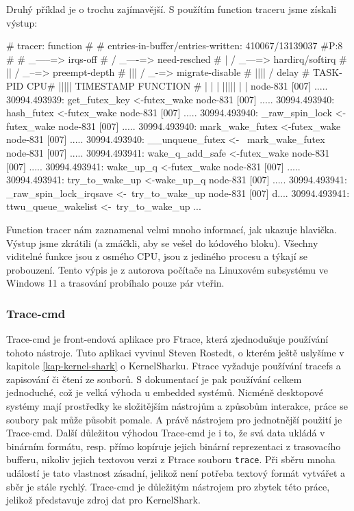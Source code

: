 Druhý příklad je o trochu zajímavější. S použítím function traceru jsme získali výstup:
\begin{code}
# tracer: function
#
# entries-in-buffer/entries-written: 410067/13139037   #P:8
#
#                      _-----=> irqs-off
#                     / _----=> need-resched
#                    | / _---=> hardirq/softirq
#                    || / _--=> preempt-depth
#                    ||| / _-=> migrate-disable
#                    |||| /     delay
# TASK-PID     CPU#  |||||  TIMESTAMP  FUNCTION
#    | |         |   |||||     |         |
  node-831     [007] ..... 30994.493939: get_futex_key <-futex_wake
  node-831     [007] ..... 30994.493940: hash_futex <-futex_wake
  node-831     [007] ..... 30994.493940: _raw_spin_lock <-futex_wake
  node-831     [007] ..... 30994.493940: mark_wake_futex <-futex_wake
  node-831     [007] ..... 30994.493940: __unqueue_futex <- \
                                         mark_wake_futex
  node-831     [007] ..... 30994.493941: wake_q_add_safe <-futex_wake
  node-831     [007] ..... 30994.493941: wake_up_q <-futex_wake
  node-831     [007] ..... 30994.493941: try_to_wake_up <-wake_up_q
  node-831     [007] ..... 30994.493941: _raw_spin_lock_irqsave <-\
                                         try_to_wake_up
  node-831     [007] d.... 30994.493941: ttwu_queue_wakelist <-\
                                         try_to_wake_up
...
\end{code}
Function tracer nám zaznamenal velmi mnoho informací, jak ukazuje hlavička. Výstup jsme zkrátili (a zmáčkli, aby se vešel do kódového bloku). Všechny viditelné funkce jsou z osmého CPU, jsou z jediného procesu a týkají se probouzení. Tento výpis je z autorova počítače na Linuxovém subsystému ve Windows 11 a trasování probíhalo pouze pár vteřin.

\subsubsection{Trace-cmd}

Trace-cmd \cite{Trace-cmd-LWM} je front-endová aplikace pro Ftrace, která zjednodušuje používání tohoto nástroje. Tuto aplikaci vyvinul Steven Rostedt, o kterém ještě uslyšíme v kapitole \ref{kap-kernel-shark} o KernelSharku. Ftrace vyžaduje používání tracefs a zapisování či čtení ze souborů. S dokumentací je pak používání celkem jednoduché, což je velká výhoda u embedded systémů. Nicméně desktopové systémy mají prostředky ke složitějším nástrojům a způsobům interakce, práce se soubory pak může působit pomale. A právě nástrojem pro jednotnější použití je Trace-cmd. Další důležitou výhodou Trace-cmd je i to, že svá data ukládá v binárním formátu, resp. přímo kopíruje jejich binární reprezentaci z trasovacího bufferu, nikoliv jejich textovou verzi z Ftrace souboru \texttt{trace}. Při sběru mnoha událostí je tato vlastnost zásadní, jelikož není potřeba textový formát vytvářet a sběr je stále rychlý. Trace-cmd je důležitým nástrojem pro zbytek této práce, jelikož představuje zdroj dat pro KernelShark.

